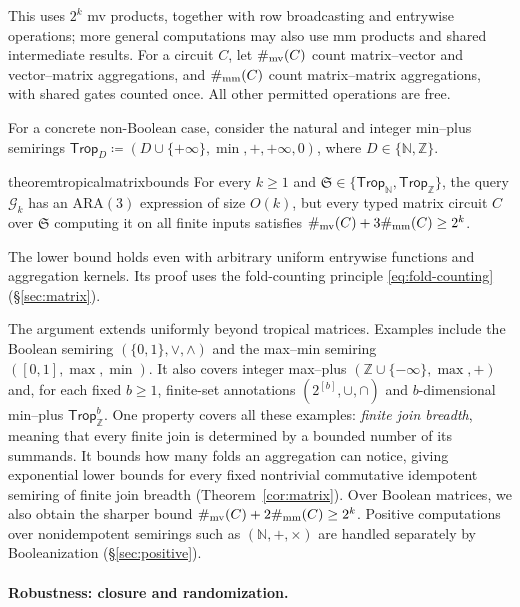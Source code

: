 This uses $2^k$ mv products, together with row broadcasting and
entrywise operations; more general computations may also use mm
products and shared intermediate results.
For a circuit $C$, let $\#_{\mathrm{mv}}(C)$ count matrix--vector and
vector--matrix aggregations, and $\#_{\mathrm{mm}}(C)$ count matrix--matrix
aggregations, with shared gates counted once. All other permitted
operations are free.

For a concrete non-Boolean case, consider the natural and integer
min--plus semirings
$\mathsf{Trop}_D \coloneqq (D\cup\{+\infty\},\min,+,+\infty,0)$,
where $D\in\{\mathbb N,\mathbb Z\}$.

\begin{restatable}{theorem}{tropicalmatrixbounds}\label{thm:tropical-matrix}
For every $k\ge1$ and $\mathfrak S\in\{\mathsf{Trop}_{\mathbb N},\mathsf{Trop}_{\mathbb Z}\}$,
the query $\mathcal G_k$ has an ARA$(3)$ expression of size $O(k)$,
but every typed matrix circuit $C$ over $\mathfrak S$ computing it
on all finite inputs satisfies $\#_{\mathrm{mv}}(C)+3\#_{\mathrm{mm}}(C)\ge2^k$.
\end{restatable}
The lower bound holds even with arbitrary uniform entrywise functions
and aggregation kernels. Its proof uses the fold-counting principle
\eqref{eq:fold-counting} (\S\ref{sec:matrix}).

The argument extends uniformly beyond tropical matrices.
Examples include the Boolean semiring $(\{0,1\},\lor,\land)$
and the max--min semiring $([0,1],\max,\min)$.
It also covers integer max--plus
$(\mathbb Z\cup\{-\infty\},\max,+)$ and, for each fixed $b\ge1$,
finite-set annotations $(2^{[b]},\cup,\cap)$ and $b$-dimensional
min--plus $\mathsf{Trop}_{\mathbb Z}^{b}$.
One property covers all these examples: \emph{finite join breadth},
meaning that every finite join is determined by a bounded number
of its summands. It bounds how many folds an aggregation can notice,
giving exponential lower bounds for every fixed nontrivial
commutative idempotent semiring of finite join breadth
(Theorem~\ref{cor:matrix}). Over Boolean matrices, we also obtain
the sharper bound $\#_{\mathrm{mv}}(C)+2\#_{\mathrm{mm}}(C)\ge2^k$.
Positive computations over nonidempotent semirings such as
$(\mathbb N,+,\times)$ are handled separately by Booleanization
(\S\ref{sec:positive}).

\paragraph{Robustness: closure and randomization.}

